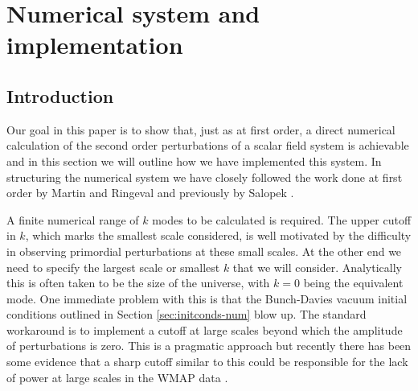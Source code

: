 \renewcommand{\CVSrevision}{\version$Id: numerical.tex,v 1.18 2009/10/05 18:19:11 ith Exp $}
% 

\chapter{Numerical system and implementation}
\label{ch:numericalsystem}

% 
% 
\section{Introduction}
\label{sec:intro-num}


Our goal in this paper is to show that, just as at first order, a
direct numerical calculation of the second order perturbations of a
scalar field system is achievable and in this section we will outline
how we have implemented this system. In structuring the numerical
system we have closely followed the work done at first order by Martin
and Ringeval \cite{Martin:2006rs, Ringeval:2007am} and previously by
Salopek \etal \cite{Salopek:1988qh}.


A finite numerical range of $k$ modes to be calculated is required.
The upper cutoff in $k$, which marks the smallest scale considered, is well
motivated by the difficulty in observing primordial perturbations at these small
scales. 
At the other end we need to specify the largest scale or smallest $k$ that we
will consider. Analytically this is often taken to be the size of the universe,
with $k=0$ being the equivalent mode. One immediate problem with this is that
the Bunch-Davies vacuum initial conditions outlined in Section
\ref{sec:initconds-num} blow up. The standard workaround is to implement a cutoff
at large scales beyond which the amplitude of perturbations is zero. This is a
pragmatic approach but recently there has been some evidence that a sharp
cutoff similar to this could be responsible for the lack of power at large
scales in the WMAP data \cite{Lyth:2007jh, spergel, Sinha:2005mn,Kim:2009pf}.
 
